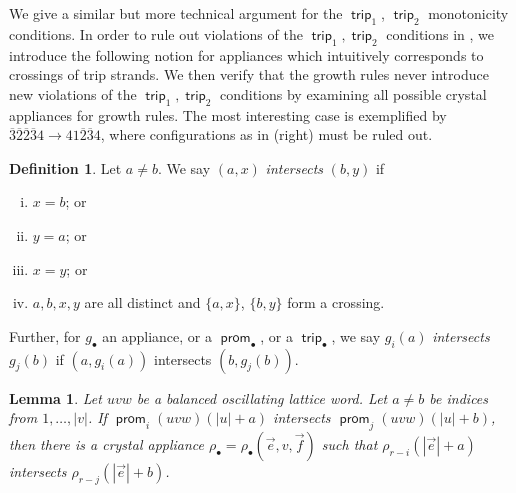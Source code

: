\documentclass{amsart}
\newtheorem{lemma}[theorem]{Lemma}
\theoremstyle{definition}
\newtheorem{definition}[theorem]{Definition}
\theoremstyle{remark}
\numberwithin{equation}{section}
\DeclareMathOperator{\trip}{\mathsf{trip}}
\DeclareMathOperator{\prom}{\mathsf{prom}}
\begin{document}
We give a similar but more technical argument for the $\trip_1$, $\trip_2$ monotonicity conditions. In order to rule out violations of the $\trip_1, \trip_2$ conditions in , we introduce the following notion for appliances which intuitively corresponds to crossings of trip strands. We then verify that the growth rules never introduce new violations of the $\trip_1, \trip_2$ conditions by examining all possible crystal appliances for growth rules. The most interesting case is exemplified by $\overline{3}\overline{2}\overline{2}\overline{3}4 \to 41\overline{2}\overline{3}4$, where configurations as in  (right) must be ruled out.

\begin{definition}\label{def:intersecting}
  Let $a \neq b$. We say $(a, x)$ \textit{intersects} $(b, y)$ if
  \begin{enumerate}[(i)]
      \item $x = b$; or
      \item $y = a$; or
      \item $x = y$; or
      \item $a, b, x, y$ are  all distinct and $\{a, x\}$, $\{b, y\}$ form a crossing.
  \end{enumerate}
  Further, for $g_\bullet$ an appliance, or a $\prom_\bullet$, or a $\trip_\bullet$, we say $g_i(a)$ \textit{intersects} $g_j(b)$ if $(a, g_i(a))$ intersects $(b, g_j(b))$.
\end{definition}

\begin{lemma}\label{lem:touching-rho}
  Let $uvw$ be a balanced oscillating lattice word. Let $a \neq b$ be indices from $1,\ldots,|v|$. If $\prom_i(uvw)(|u|+a)$ intersects $\prom_j(uvw)(|u|+b)$, then there is a crystal appliance $\rho_\bullet = \rho_\bullet(\vec{e}, v, \vec{f})$ such that $\rho_{r-i}(|\vec{e}|+a)$ intersects $\rho_{r-j}(|\vec{e}|+b)$.
\end{lemma}
\end{document}
